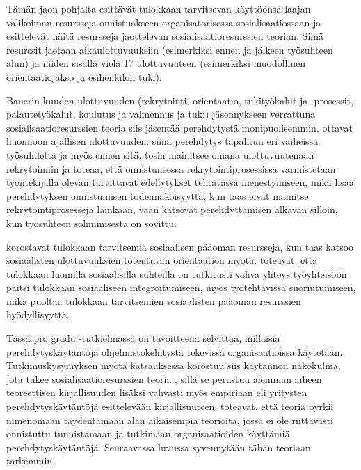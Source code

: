 \documentclass[utf8]{gradu3}
\begin{document}
Tämän jaon pohjalta \textcite{saks-gruman-2012} esittävät tulokkaan tarvitsevan käyttöönsä laajan valikoiman resursseja onnistuakseen organisatorisessa sosialisaatiossaan ja esittelevät näitä resursseja jaottelevan sosialisaatioresurssien teorian. Siinä resurssit jaetaan aikaulottuvuuksiin (esimerkiksi ennen ja jälkeen työsuhteen alun) ja niiden sisällä vielä 17 ulottuvuuteen (esimerkiksi muodollinen orientaatiojakso ja esihenkilön tuki).

Bauerin kuuden ulottuvuuden (rekrytointi, orientaatio, tukityökalut ja -prosessit, palautetyökalut, koulutus ja valmennus ja tuki) jäsennykseen verrattuna sosialisaatioresurssien teoria \parencite{saks-gruman-2012} siis jäsentää perehdytystä monipuolisemmin. \textcite{saks-gruman-2012} ottavat huomioon ajallisen ulottuvuuden: siinä perehdytys tapahtuu eri vaiheissa työsuhdetta ja myös ennen sitä. \textcite{bauer-2010} tosin mainitsee omana ulottuvuutenaan rekrytoinnin ja toteaa, että onnistuneessa rekrytointiprosessissa varmistetaan työntekijällä olevan tarvittavat edellytykset tehtävässä menestymiseen, mikä lisää perehdytyksen onnistumisen todennäköisyyttä, kun taas \textcite{saks-gruman-2012} eivät mainitse rekrytointiprosesseja lainkaan, vaan katsovat perehdyttämisen alkavan silloin, kun työsuhteen solmimisesta on sovittu. 

\textcite{saks-gruman-2012} korostavat tulokkaan tarvitsemia sosiaalisen pääoman resursseja, kun taas \textcite{bauer-2010} katsoo sosiaalisten ulottuvuuksien toteutuvan orientaation myötä. \textcite{zhao-ym-2022} toteavat, että tulokkaan luomilla sosiaalisilla suhteilla on tutkitusti vahva yhteys työyhteisöön paitsi tulokkaan sosiaaliseen integroitumiseen, myös työtehtävissä suoriutumiseen, mikä puoltaa tulokkaan tarvitsemien sosiaalisten pääoman resurssien hyödyllisyyttä.

Tässä pro gradu -tutkielmassa on tavoitteena selvittää, millaisia perehdytyskäytäntöjä ohjelmistokehitystä tekevissä organisaatioissa käytetään. Tutkimuskysymyksen myötä katsauksessa korostuu siis käytännön näkökulma, jota tukee sosialisaatioresurssien teoria \parencite{saks-gruman-2012}, sillä se perustuu aiemman aiheen teoreettisen kirjallisuuden lisäksi vahvasti myös empiriaan eli yritysten perehdytyskäytäntöjä esittelevään kirjallisuuteen. \textcite{saks-gruman-2012} toteavat, että teoria pyrkii nimenomaan täydentämään alan aikaisempia teorioita, jossa ei ole riittävästi onnistuttu tunnistamaan ja tutkimaan organisaatioiden käyttämiä perehdytyskäytäntöjä. Seuraavassa luvussa syvennytään tähän teoriaan tarkemmin.
\end{document}
